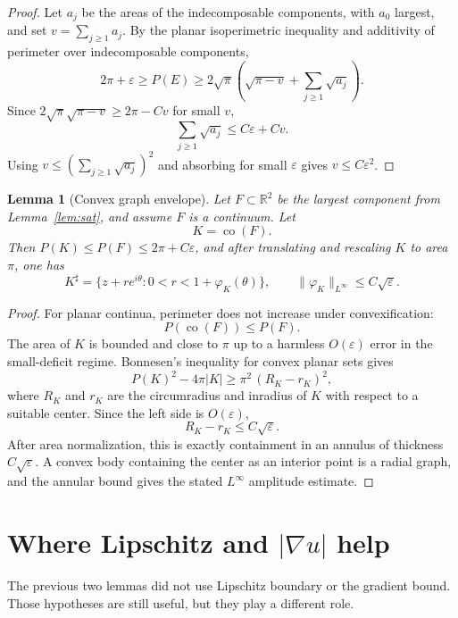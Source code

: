 \documentclass[11pt]{article}
\newtheorem{lemma}[theorem]{Lemma}
\newcommand{\R}{\mathbb R}
\begin{document}
\begin{proof}
Let \(a_j\) be the areas of the indecomposable components, with \(a_0\)
largest, and set \(v=\sum_{j\ge1}a_j\).  By the planar isoperimetric
inequality and additivity of perimeter over indecomposable components,
\[
   2\pi+\varepsilon
      \ge P(E)
      \ge 2\sqrt\pi\left(\sqrt{\pi-v}+\sum_{j\ge1}\sqrt{a_j}\right).
\]
Since \(2\sqrt\pi\sqrt{\pi-v}\ge 2\pi-Cv\) for small \(v\),
\[
   \sum_{j\ge1}\sqrt{a_j}\le C\varepsilon+Cv.
\]
Using \(v\le(\sum_{j\ge1}\sqrt{a_j})^2\) and absorbing for small
\(\varepsilon\) gives \(v\le C\varepsilon^2\).
\end{proof}

\begin{lemma}[Convex graph envelope]
\label{lem:convex-envelope}
Let \(F\subset\R^2\) be the largest component from
Lemma~\ref{lem:sat}, and assume \(F\) is a continuum.  Let
\[
   K=\operatorname{co}(F).
\]
Then \(P(K)\le P(F)\le2\pi+C\varepsilon\), and after translating and
rescaling \(K\) to area \(\pi\), one has
\[
   K^\sharp=\{z+re^{i\theta}:0<r<1+\varphi_K(\theta)\},
   \qquad
   \|\varphi_K\|_{L^\infty}\le C\sqrt{\varepsilon}.
\]
\end{lemma}

\begin{proof}
For planar continua, perimeter does not increase under convexification:
\[
   P(\operatorname{co}(F))\le P(F).
\]
The area of \(K\) is bounded and close to \(\pi\) up to a harmless
\(O(\varepsilon)\) error in the small-deficit regime.  Bonnesen's inequality
for convex planar sets gives
\[
   P(K)^2-4\pi |K|
      \ge \pi^2\,(R_K-r_K)^2,
\]
where \(R_K\) and \(r_K\) are the circumradius and inradius of \(K\) with
respect to a suitable center.  Since the left side is \(O(\varepsilon)\),
\[
   R_K-r_K\le C\sqrt\varepsilon .
\]
After area normalization, this is exactly containment in an annulus of
thickness \(C\sqrt\varepsilon\).  A convex body containing the center as an
interior point is a radial graph, and the annular bound gives the stated
\(L^\infty\) amplitude estimate.
\end{proof}

\section{Where Lipschitz and \(|\nabla u|\) help}

The previous two lemmas did not use Lipschitz boundary or the gradient bound.
Those hypotheses are still useful, but they play a different role.
\end{document}
